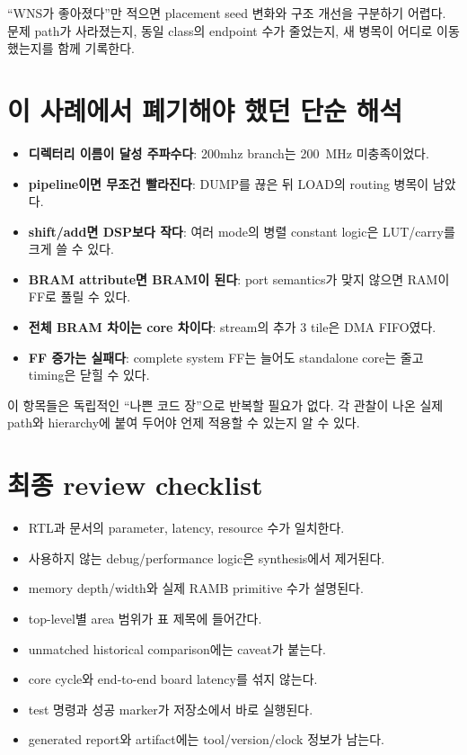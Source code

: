 ``WNS가 좋아졌다''만 적으면 placement seed 변화와 구조 개선을 구분하기 어렵다.
문제 path가 사라졌는지, 동일 class의 endpoint 수가 줄었는지, 새 병목이 어디로
이동했는지를 함께 기록한다.

\section{이 사례에서 폐기해야 했던 단순 해석}

\begin{itemize}
  \item \textbf{디렉터리 이름이 달성 주파수다}: 200mhz branch는 200~MHz 미충족이었다.
  \item \textbf{pipeline이면 무조건 빨라진다}: DUMP를 끊은 뒤 LOAD의 routing 병목이 남았다.
  \item \textbf{shift/add면 DSP보다 작다}: 여러 mode의 병렬 constant logic은 LUT/carry를 크게 쓸 수 있다.
  \item \textbf{BRAM attribute면 BRAM이 된다}: port semantics가 맞지 않으면 RAM이 FF로 풀릴 수 있다.
  \item \textbf{전체 BRAM 차이는 core 차이다}: stream의 추가 3 tile은 DMA FIFO였다.
  \item \textbf{FF 증가는 실패다}: complete system FF는 늘어도 standalone core는 줄고 timing은 닫힐 수 있다.
\end{itemize}

이 항목들은 독립적인 ``나쁜 코드 장''으로 반복할 필요가 없다. 각 관찰이 나온
실제 path와 hierarchy에 붙여 두어야 언제 적용할 수 있는지 알 수 있다.

\section{최종 review checklist}

\begin{checklistbox}
\begin{itemize}
  \item RTL과 문서의 parameter, latency, resource 수가 일치한다.
  \item 사용하지 않는 debug/performance logic은 synthesis에서 제거된다.
  \item memory depth/width와 실제 RAMB primitive 수가 설명된다.
  \item top-level별 area 범위가 표 제목에 들어간다.
  \item unmatched historical comparison에는 caveat가 붙는다.
  \item core cycle와 end-to-end board latency를 섞지 않는다.
  \item test 명령과 성공 marker가 저장소에서 바로 실행된다.
  \item generated report와 artifact에는 tool/version/clock 정보가 남는다.
\end{itemize}
\end{checklistbox}
